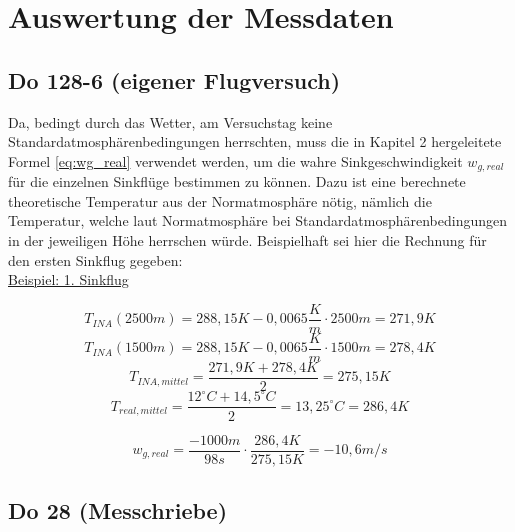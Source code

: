 \chapter{Auswertung der Messdaten}
\label{chapter:auswertung}

\section{Do 128-6 (eigener Flugversuch)}

Da, bedingt durch das Wetter, am Versuchstag keine Standardatmosphärenbedingungen herrschten, muss die in Kapitel 2 hergeleitete Formel \ref{eq:wg_real} verwendet werden, um die wahre Sinkgeschwindigkeit $w_{g,real}$ für die einzelnen Sinkflüge bestimmen zu können. Dazu ist eine berechnete theoretische Temperatur aus der Normatmosphäre nötig, nämlich die Temperatur, welche laut Normatmosphäre bei Standardatmosphärenbedingungen in der jeweiligen Höhe herrschen würde. Beispielhaft sei hier die Rechnung für den ersten Sinkflug gegeben:\\

\underline{Beispiel: 1. Sinkflug}

\begin{equation}
T_{INA}(2500m) = 288,15 K - 0,0065 \frac{K}{m} \cdot 2500m = 271,9 K
\end{equation}
\begin{equation}
T_{INA}(1500m) = 288,15 K - 0,0065 \frac{K}{m} \cdot 1500m = 278,4 K
\end{equation}
\begin{equation}
T_{INA,mittel} = \frac{271,9K + 278,4K}{2} = 275,15 K
\end{equation}
\begin{equation}
T_{real,mittel} = \frac{12^\circ C + 14,5^\circ C}{2} = 13,25^\circ C =	286,4 K
\end{equation}

\begin{equation}
w_{g,real} = \frac{-1000m}{98s} \cdot \frac{286,4K}{275,15K} = - 10,6m/s
\end{equation}


\section{Do 28 (Messchriebe)}

\newpage